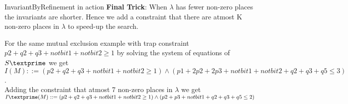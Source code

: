 \documentclass{beamer}
\begin{document}
\begin{frame}{InvariantByRefinement in action}
  \textbf{Final Trick}:
  When $\lambda$ has fewer non-zero places the invariants are shorter. Hence we add a constraint that there are atmost K non-zero places in $\lambda$ to speed-up the search.
\begin{example}
For the same mutual exclusion example with trap constraint  $p2+q2+q3+notbit1+notbit2 \geq 1$  by solving the system of equations of $S\textprime$
we get \\
$I(M)::=(p2+q2+q3+notbit1+notbit2\geq1) \land (p1+2p2+2p3+notbit1+notbit2+q2+q3+q5\leq3)$.\\
Adding the constraint that atmost 7 non-zero places in $\lambda $ we get \\
$I\textprime(M)::=(p2+q2+q3+notbit1+notbit2\geq1) \land (p2+p3+notbit1+q2+q3+q5 \leq 2)$

\end{example}
\end{frame}




  
\end{document}
